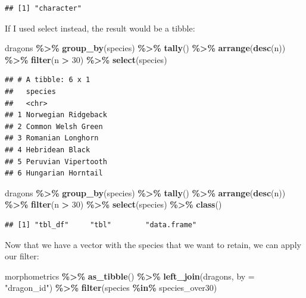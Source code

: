 \documentclass[
]{book}
\newenvironment{Shaded}{\begin{snugshade}}{\end{snugshade}}
\newcommand{\AttributeTok}[1]{\textcolor[rgb]{0.13,0.29,0.53}{#1}}
\newcommand{\DecValTok}[1]{\textcolor[rgb]{0.00,0.00,0.81}{#1}}
\newcommand{\FunctionTok}[1]{\textcolor[rgb]{0.13,0.29,0.53}{\textbf{#1}}}
\newcommand{\NormalTok}[1]{#1}
\newcommand{\SpecialCharTok}[1]{\textcolor[rgb]{0.81,0.36,0.00}{\textbf{#1}}}
\newcommand{\StringTok}[1]{\textcolor[rgb]{0.31,0.60,0.02}{#1}}
\begin{document}
\begin{verbatim}
## [1] "character"
\end{verbatim}

If I used select instead, the result would be a tibble:

\begin{Shaded}
\begin{Highlighting}[]
\NormalTok{dragons }\SpecialCharTok{\%\textgreater{}\%} 
  \FunctionTok{group\_by}\NormalTok{(species) }\SpecialCharTok{\%\textgreater{}\%}
  \FunctionTok{tally}\NormalTok{() }\SpecialCharTok{\%\textgreater{}\%} 
  \FunctionTok{arrange}\NormalTok{(}\FunctionTok{desc}\NormalTok{(n)) }\SpecialCharTok{\%\textgreater{}\%} 
  \FunctionTok{filter}\NormalTok{(n }\SpecialCharTok{\textgreater{}} \DecValTok{30}\NormalTok{) }\SpecialCharTok{\%\textgreater{}\%} 
  \FunctionTok{select}\NormalTok{(species)}
\end{Highlighting}
\end{Shaded}

\begin{verbatim}
## # A tibble: 6 x 1
##   species            
##   <chr>              
## 1 Norwegian Ridgeback
## 2 Common Welsh Green 
## 3 Romanian Longhorn  
## 4 Hebridean Black    
## 5 Peruvian Vipertooth
## 6 Hungarian Horntail
\end{verbatim}

\begin{Shaded}
\begin{Highlighting}[]
\NormalTok{dragons }\SpecialCharTok{\%\textgreater{}\%} 
  \FunctionTok{group\_by}\NormalTok{(species) }\SpecialCharTok{\%\textgreater{}\%}
  \FunctionTok{tally}\NormalTok{() }\SpecialCharTok{\%\textgreater{}\%} 
  \FunctionTok{arrange}\NormalTok{(}\FunctionTok{desc}\NormalTok{(n)) }\SpecialCharTok{\%\textgreater{}\%} 
  \FunctionTok{filter}\NormalTok{(n }\SpecialCharTok{\textgreater{}} \DecValTok{30}\NormalTok{) }\SpecialCharTok{\%\textgreater{}\%} 
  \FunctionTok{select}\NormalTok{(species) }\SpecialCharTok{\%\textgreater{}\%} 
  \FunctionTok{class}\NormalTok{()}
\end{Highlighting}
\end{Shaded}

\begin{verbatim}
## [1] "tbl_df"     "tbl"        "data.frame"
\end{verbatim}

Now that we have a vector with the species that we want to retain, we can apply
our filter:

\begin{Shaded}
\begin{Highlighting}[]
\NormalTok{morphometrics }\SpecialCharTok{\%\textgreater{}\%} 
  \FunctionTok{as\_tibble}\NormalTok{() }\SpecialCharTok{\%\textgreater{}\%} 
  \FunctionTok{left\_join}\NormalTok{(dragons, }\AttributeTok{by =} \StringTok{"dragon\_id"}\NormalTok{) }\SpecialCharTok{\%\textgreater{}\%} 
  \FunctionTok{filter}\NormalTok{(species }\SpecialCharTok{\%in\%}\NormalTok{ species\_over30)}
\end{Highlighting}
\end{Shaded}
\end{document}
